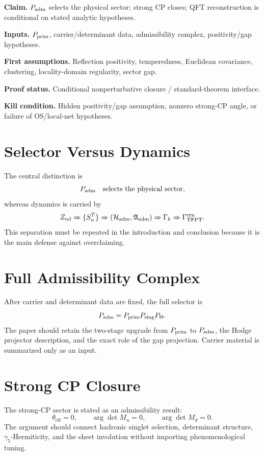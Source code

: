 \documentclass[11pt,a4paper]{article}
\begin{document}
\begin{tfptclaimcontract}
\textbf{Claim.} $P_{\mathrm{adm}}$ selects the physical sector; strong CP closes; QFT reconstruction is conditional on stated analytic hypotheses.\par
\textbf{Inputs.} $P_{\mathrm{prim}}$, carrier/determinant data, admissibility complex, positivity/gap hypotheses.\par
\textbf{First assumptions.} Reflection positivity, temperedness, Euclidean covariance, clustering, locality-domain regularity, sector gap.\par
\textbf{Proof status.} Conditional nonperturbative closure / standard-theorem interface.\par
\textbf{Kill condition.} Hidden positivity/gap assumption, nonzero strong-CP angle, or failure of OS/local-net hypotheses.\par
\end{tfptclaimcontract}

\tableofcontents

\section{Selector Versus Dynamics}

The central distinction is
\[
P_{\mathrm{adm}}\quad\text{selects the physical sector},
\]
whereas dynamics is carried by
\[
Z_{\mathrm{rel}}
\Rightarrow
\{S_n^T\}
\Rightarrow
(\mathcal H_{\mathrm{adm}},\mathfrak A_{\mathrm{adm}})
\Rightarrow
\Gamma_k
\Rightarrow
\Gamma_{\mathrm{TFPT}}^{\mathrm{ren}} .
\]
This separation must be repeated in the introduction and conclusion because it is the main defense
against overclaiming.

\section{Full Admissibility Complex}

After carrier and determinant data are fixed, the full selector is
\[
P_{\mathrm{adm}}=P_{\mathrm{prim}} P_{\mathrm{sing}}P_\Theta.
\]
The paper should retain the two-stage upgrade from $P_{\mathrm{prim}}$ to $P_{\mathrm{adm}}$, the Hodge projector
description, and the exact role of the gap projection. Carrier material is summarized only as an
input.

\section{Strong CP Closure}

The strong-CP sector is stated as an admissibility result:
\[
\theta_{\mathrm{eff}}=0,
\qquad
\operatorname{arg}\det M_u=0,
\qquad
\operatorname{arg}\det M_d=0.
\]
The argument should connect hadronic singlet selection, determinant structure,
$\gamma_5$-Hermiticity, and the sheet involution without importing phenomenological tuning.
\end{document}
